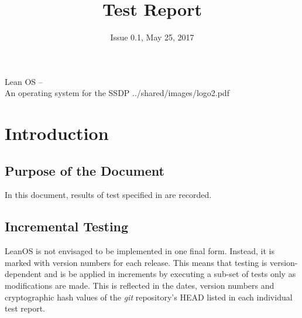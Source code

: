

\title{Test Report}
\def \documentid {LEANOS-UVIE-TR-001}
\date{Issue 0.1, May 25, 2017}

\newcommand\affil[1]{\textsuperscript#1}

\def\preparedby {Armin Luntzer\affil{1}}
\def\checkedby {Roland Ottensamer\affil{1}}
\def\approvedby {Franz Kerschbaum\affil{1}}

\def\affiliations{
	\affil{1} Department of Astrophysics, University of Vienna
}









\usepackage{fancyvrb}
\usepackage{enumitem}
\usepackage{vhistory}

\usepackage{biblatex}








\setmainfont{MyriadPro-SemiCondensed}
\uvietitlepage%
{Lean OS --\\ An operating system for the SSDP}%
{\doctitle}%
{../shared/images/logo2.pdf}
\setmainfont{MyriadPro}

\approvalpage

\tableofcontents
\newpage



\begin{versionhistory}
\end{versionhistory}


\chapter{Introduction}

\section{Purpose of the Document}

In this document, results of test specified in \cite{leanosTS} are recorded.


\section{Incremental Testing}

LeanOS is not envisaged to be implemented in one final form. Instead, it is
marked with version numbers for each release. This means that testing is
version-dependent and is be applied in increments by executing a sub-set of
tests only as modifications are made. This is reflected in the dates, version
numbers and cryptographic hash values of the \emph{git} repository's {HEAD}
listed in each individual test report.

